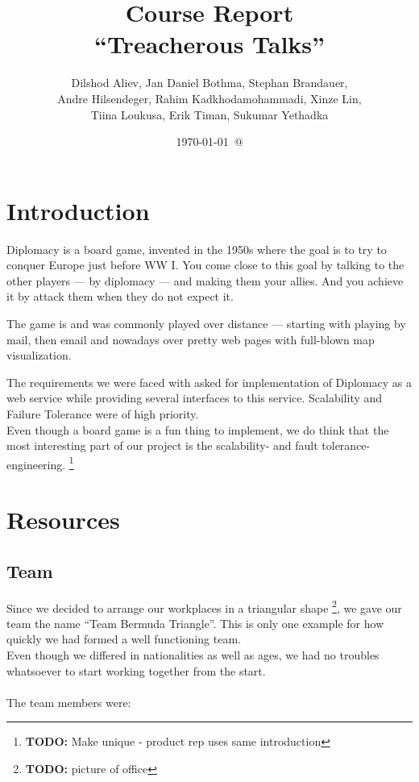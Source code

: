 \documentclass[11pt,a4paper]{report}
\newcommand{\todo}[1]{\footnote{{\color{red} {\bf TODO:} #1}}}
\begin{document}
\title{Course Report \\
  ``Treacherous Talks''}
\date{\today\ @ \currenttime}
\author{Dilshod Aliev, Jan Daniel Bothma, Stephan Brandauer,\\
 Andre Hilsendeger, Rahim Kadkhodamohammadi, Xinze Lin,\\
Tiina Loukusa, Erik Timan, Sukumar Yethadka}
\maketitle
\tableofcontents

\chapter{Introduction}
Diplomacy is a board game, invented in the 1950s where the goal is to try to
conquer Europe just before WW I. You come close to this goal by talking to the
other players --- by diplomacy --- and making them your allies. And you achieve
it by attack them when they do not expect it.

The game is and was commonly played over distance --- starting with playing by
mail, then email and nowadays over pretty web pages with full-blown map
visualization.

The requirements we were faced with asked for implementation of Diplomacy as a
web service while providing several interfaces to this service. Scalability and
Failure Tolerance were of high priority. \\
Even though a board game is a fun thing to implement, we do think that the most
interesting part of our project is the scalability- and fault tolerance-
engineering.
\todo{Make unique - product rep uses same introduction}

\chapter{Resources}
\section{Team}
Since we decided to arrange our workplaces in a triangular shape
\todo{picture of office}, we gave our team the name ``Team Bermuda Triangle''.
This is only one example for how quickly we had formed a well functioning
team. \\
Even though we differed in nationalities as well as ages, we had no
troubles whatsoever to start working together from the start.\\
\\
The team members were: \\
\end{document}
